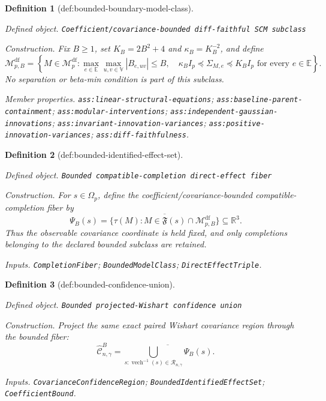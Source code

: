 \documentclass{article}
\newtheorem{definition}{Definition}
\begin{document}
\begin{definition}[def:bounded-boundary-model-class]\label{def:bounded-boundary-model-class}
\par\smallskip\noindent\emph{Defined object.} \texttt{Coefficient/\allowbreak{}covariance-\allowbreak{}bounded diff-\allowbreak{}faithful SCM subclass}
\par\smallskip\noindent\emph{Construction.} Fix \(B\ge1\), set \(K_B=2B^2+4\) and \(\kappa_B=K_B^{-2}\), and define
\[
 \mathcal M_{p,B}^{\mathrm{df}}
 =\left\{M\in\mathcal M_p^{\mathrm{df}}:
 \max_{e\in\mathbb E}\max_{u,v\in\mathbb V}|B_{e,uv}|\le B,
 \quad
 \kappa_B I_p\preceq\Sigma_{M,e}\preceq K_BI_p
 \text{ for every }e\in\mathbb E\right\}.
\]
No separation or beta-min condition is part of this subclass.
\par\smallskip\noindent\emph{Member properties.} \texttt{ass:\allowbreak{}linear-\allowbreak{}structural-\allowbreak{}equations}; \texttt{ass:\allowbreak{}baseline-\allowbreak{}parent-\allowbreak{}containment}; \texttt{ass:\allowbreak{}modular-\allowbreak{}interventions}; \texttt{ass:\allowbreak{}independent-\allowbreak{}gaussian-\allowbreak{}innovations}; \texttt{ass:\allowbreak{}invariant-\allowbreak{}innovation-\allowbreak{}variances}; \texttt{ass:\allowbreak{}positive-\allowbreak{}innovation-\allowbreak{}variances}; \texttt{ass:\allowbreak{}diff-\allowbreak{}faithfulness}.
\end{definition}

\begin{definition}[def:bounded-identified-effect-set]\label{def:bounded-identified-effect-set}
\par\smallskip\noindent\emph{Defined object.} \texttt{Bounded compatible-\allowbreak{}completion direct-\allowbreak{}effect fiber}
\par\smallskip\noindent\emph{Construction.} For \(s\in\Omega_p\), define the coefficient/covariance-bounded compatible-completion fiber by
\[
 \Psi_B(s)
 =\overline{\{\tau(M):M\in\mathfrak F(s)\cap
 \mathcal M_{p,B}^{\mathrm{df}}\}}\subseteq\mathbb R^3.
\]
Thus the observable covariance coordinate is held fixed, and only completions belonging to the declared bounded subclass are retained.
\par\smallskip\noindent\emph{Inputs.} \texttt{CompletionFiber}; \texttt{BoundedModelClass}; \texttt{DirectEffectTriple}.
\end{definition}

\begin{definition}[def:bounded-confidence-union]\label{def:bounded-confidence-union}
\par\smallskip\noindent\emph{Defined object.} \texttt{Bounded projected-\allowbreak{}Wishart confidence union}
\par\smallskip\noindent\emph{Construction.} Project the same exact paired Wishart covariance region through the bounded fiber:
\[
\widehat{\mathcal C}^{B}_{n,\gamma}
 =\overline{\bigcup_{s:\operatorname{vech}^{-1}(s)
 \in\mathcal R_{n,\gamma}}\Psi_B(s)}.
\]
\par\smallskip\noindent\emph{Inputs.} \texttt{CovarianceConfidenceRegion}; \texttt{BoundedIdentifiedEffectSet}; \texttt{CoefficientBound}.
\end{definition}
\end{document}
